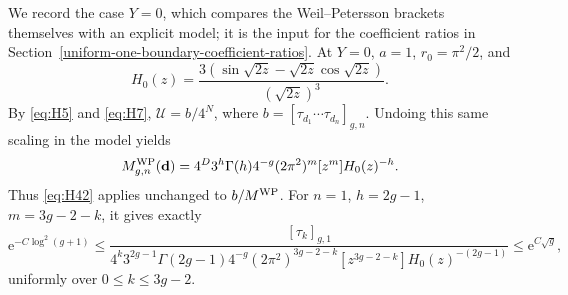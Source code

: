 We record the case \(Y=0\), which compares the Weil--Petersson brackets
themselves with an explicit model; it is the input for the coefficient
ratios in Section~\ref{uniform-one-boundary-coefficient-ratios}. At \(Y=0\), \(a=1\), \(r_0=\pi^2/2\), and \[
H_0(z)=\frac{3(\sin\sqrt{2z}-\sqrt{2z}\cos\sqrt{2z})}
 {(\sqrt{2z})^3}.
\] By \eqref{eq:H5} and \eqref{eq:H7}, \(\mathcal U=b/4^N\), where
\(b=[\tau_{d_1}\cdots\tau_{d_n}]_{g,n}\). Undoing this same scaling in
the model yields \begin{equation}
M^{\rm WP}_{g,n}(\mathbf d)
=4^D3^h\Gamma(h)4^{-g}(2\pi^2)^m
 [z^m]H_0(z)^{-h}.
\label{eq:H43}
\end{equation} Thus \eqref{eq:H42} applies unchanged to \(b/M^{\rm WP}\). For \(n=1\),
\(h=2g-1\), \(m=3g-2-k\), it gives exactly \begin{equation}
\mathrm{e}^{-C\log^2(g+1)}
\le
\frac{[\tau_k]_{g,1}}
 {4^k3^{2g-1}\Gamma(2g-1)4^{-g}(2\pi^2)^{3g-2-k}
 [z^{3g-2-k}]H_0(z)^{-(2g-1)}}
\le \mathrm{e}^{C\sqrt g},
\label{eq:H44}
\end{equation} uniformly over \(0\le k\le3g-2\).
